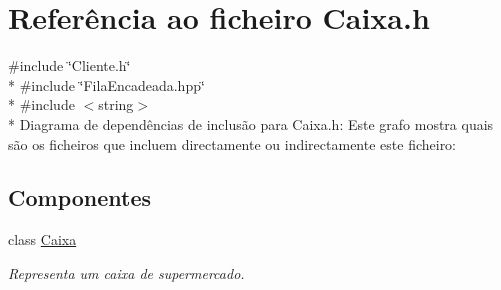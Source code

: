 \hypertarget{a00008}{\section{Referência ao ficheiro Caixa.\+h}
\label{a00008}
}
{\ttfamily \#include \char`\"{}Cliente.\+h\char`\"{}}\\*
{\ttfamily \#include \char`\"{}Fila\+Encadeada.\+hpp\char`\"{}}\\*
{\ttfamily \#include $<$string$>$}\\*
Diagrama de dependências de inclusão para Caixa.\+h\+:
Este grafo mostra quais são os ficheiros que incluem directamente ou indirectamente este ficheiro\+:
\subsection*{Componentes}
\begin{DoxyCompactItemize}
\item 
class \hyperlink{a00001}{Caixa}
\begin{DoxyCompactList}\small\item\em Representa um caixa de supermercado. \end{DoxyCompactList}\end{DoxyCompactItemize}
